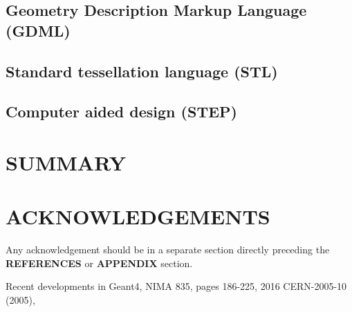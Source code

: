 \documentclass[a4paper,
               keeplastbox,   %
               ]{jacow}
\begin{document}
%

\subsection{Geometry Description Markup Language (GDML)}

\subsection{Standard tessellation language (STL)}

\subsection{Computer aided design (STEP)}


\section{SUMMARY}

\section{ACKNOWLEDGEMENTS}
Any acknowledgement should be in a separate section directly preceding
the \textbf{REFERENCES} or \textbf{APPENDIX} section.


%
%

%
	{\printbibliography}%
	{%
	
	\begin{thebibliography}{9} %
	
	 Recent developments in Geant4, NIMA 835, pages 186-225, 2016 
	 CERN-2005-10 (2005), 
	

	\end{thebibliography}
} %


% 
\end{document}
